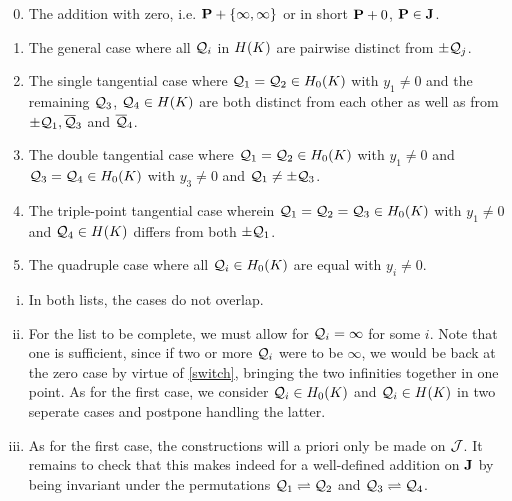 \vspace{-3mm}
\fline
\vspace{-2mm}
\begin{enumerate}\setcounter{enumi}{-1}
	\parskip 1mm
	\item The addition with zero, i.e. $\P + \{ \infty, \infty \}$ or in short $\P + 0$, $\P \in \J$.
	\item The general case where all $\q_i$ in $\ek$ are pairwise distinct from $\pm \q_j$.
	\item The single tangential case where $\q_1 = \q_2 \in \enk$ with $y_1 \neq 0$ and the remaining $\q_3$, $\q_4 \in \ek$ are both distinct from each other as well as from $\pm \q_1, \bar \q_3$ and $\bar \q_4$.
	\item The double tangential case where $\q_1 = \q_2 \in \enk$ with $y_1 \neq 0$ and $\q_3 = \q_4 \in \enk$ with $y_3 \neq 0$ and $\q_1 \neq \pm \q_3$.
	\item The triple-point tangential case wherein $\q_1=\q_2=\q_3 \in \enk$ with $y_1 \neq 0$ and $\q_4 \in \ek$ differs from both $\pm \q_1$.
	\item The quadruple case where all $\q_i \in \enk$ are equal with $y_i\neq 0$.
\end{enumerate}
\vspace{-4mm}
\fline
\parskip 3mm

\begin{remark}\label{rem}\hfill
\begin{enumerate}[(i)]
	\item In both lists, the cases do not overlap.
	
	\item For the list to be complete, we must allow for $\q_i = \infty$ for some $i$. Note that one is sufficient, since if two or more $\q_i$ were to be $\infty$, we would be back at the zero case by virtue of \eqref{switch}, bringing the two infinities together in one point. As for the first case, we consider $\q_i \in \enk$ and $\q_i \in \ek$ in two seperate cases and postpone handling the latter.\label{extend}

	\item As for the first case, the constructions will a priori only be made on $\j$. It remains to check that this makes indeed for a well-defined addition on $\J$ by being invariant under the permutations $\q_1 \rightleftharpoons \q_2$ and $\q_3 \rightleftharpoons \q_4$.
\end{enumerate}
\end{remark}

